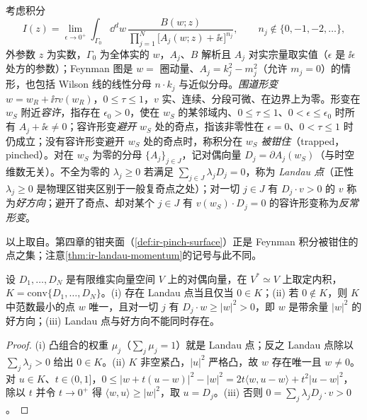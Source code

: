 \begin{definition}\label{def:front-trap}
考虑积分
\begin{equation}\label{eq:front-collins-integral}
I(z)=\lim_{\epsilon\to0^+}\int_{\Gamma_0}\dd^dw\,\frac{B(w;z)}{\prod_{j=1}^N\bigl[A_j(w;z)+\ii\epsilon\bigr]^{n_j}},\qquad n_j\notin\{0,-1,-2,\dots\},
\end{equation}
外参数 $z$ 为实数，$\Gamma_0$ 为全体实的 $w$，$A_j$、$B$ 解析且 $A_j$ 对实宗量取实值（$\epsilon$ 是 $\ii\epsilon$ 处方的参数）；Feynman 图是 $w=$ 圈动量、$A_j=k_j^2-m_j^2$（允许 $m_j=0$）的情形，也包括 Wilson 线的线性分母 $n\cdot k_j$ 与近似分母。\emph{围道形变} $w=w_R+\ii\tau v(w_R)$，$0\le\tau\le1$，$v$ 实、连续、分段可微、在边界上为零。形变在 $w_S$ 附近\emph{容许}，指存在 $\epsilon_0>0$，使在 $w_S$ 的某邻域内、$0\le\tau\le1$、$0<\epsilon\le\epsilon_0$ 时所有 $A_j+\ii\epsilon\ne0$；容许形变\emph{避开} $w_S$ 处的奇点，指该非零性在 $\epsilon=0$、$0<\tau\le1$ 时仍成立；没有容许形变避开 $w_S$ 处的奇点时，称积分在 $w_S$ \emph{被钳住}（trapped，pinched）。对在 $w_S$ 为零的分母 $\{A_j\}_{j\in J}$，记对偶向量 $D_j=\partial A_j(w_S)$（与时空维数无关）。不全为零的 $\lambda_j\ge0$ 若满足 $\sum_{j\in J}\lambda_jD_j=0$，称为 \emph{Landau 点}（正性 $\lambda_j\ge0$ 是物理区钳夹区别于一般复奇点之处）；对一切 $j\in J$ 有 $D_j\cdot v>0$ 的 $v$ 称为\emph{好方向}；避开了奇点、却对某个 $j\in J$ 有 $v(w_S)\cdot D_j=0$ 的容许形变称为\emph{反常形变}。
\end{definition}

以上取自\cite[第~II~节，定义~1--7、15]{Collins:2020euz}。第四章的钳夹面（\cref{def:ir-pinch-surface}）正是 Feynman 积分被钳住的点之集；注意\cref{thm:ir-landau-momentum}的记号与此不同。

\begin{lemma}\label{lem:front-min-norm}
设 $D_1,\dots,D_N$ 是有限维实向量空间 $V$ 上的对偶向量，在 $V^*\simeq V$ 上取定内积，$K=\mathrm{conv}\{D_1,\dots,D_N\}$。(i) 存在 Landau 点当且仅当 $0\in K$；(ii) 若 $0\notin K$，则 $K$ 中范数最小的点 $w$ 唯一，且对一切 $j$ 有 $D_j\cdot w\ge|w|^2>0$，即 $w$ 是带余量 $|w|^2$ 的好方向；(iii) Landau 点与好方向不能同时存在。
\end{lemma}

\begin{proof}
(i) 凸组合的权重 $\mu_j$（$\sum_j\mu_j=1$）就是 Landau 点；反之 Landau 点除以 $\sum_j\lambda_j>0$ 给出 $0\in K$。(ii) $K$ 非空紧凸，$|u|^2$ 严格凸，故 $w$ 存在唯一且 $w\ne0$。对 $u\in K$、$t\in(0,1]$，$0\le|w+t(u-w)|^2-|w|^2=2t\langle w,u-w\rangle+t^2|u-w|^2$，除以 $t$ 并令 $t\to0^+$ 得 $\langle w,u\rangle\ge|w|^2$，取 $u=D_j$。(iii) 否则 $0=\sum_j\lambda_jD_j\cdot v>0$。
\end{proof}

